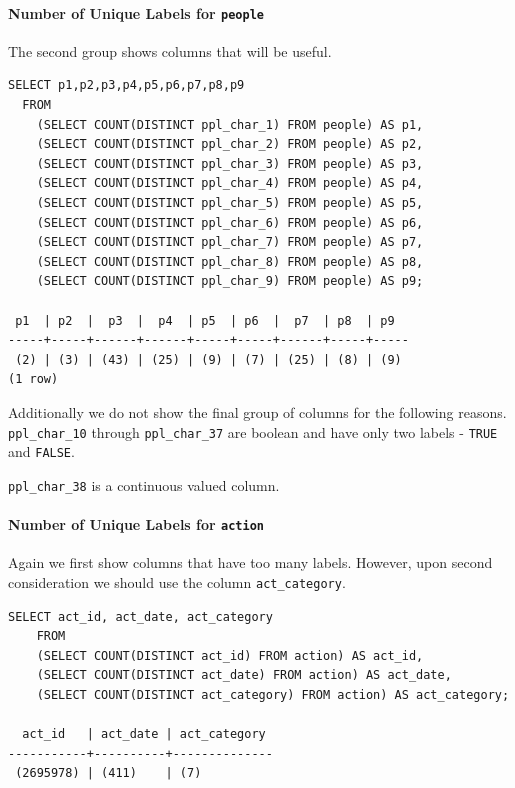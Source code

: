 \documentclass[]{report}
\begin{document}
\paragraph{Number of Unique Labels for
\texttt{people}}\label{number-of-unique-labels-for-people-1}

The second group shows columns that will be useful.

\begin{verbatim}
SELECT p1,p2,p3,p4,p5,p6,p7,p8,p9
  FROM
    (SELECT COUNT(DISTINCT ppl_char_1) FROM people) AS p1,
    (SELECT COUNT(DISTINCT ppl_char_2) FROM people) AS p2,
    (SELECT COUNT(DISTINCT ppl_char_3) FROM people) AS p3,
    (SELECT COUNT(DISTINCT ppl_char_4) FROM people) AS p4,
    (SELECT COUNT(DISTINCT ppl_char_5) FROM people) AS p5,
    (SELECT COUNT(DISTINCT ppl_char_6) FROM people) AS p6,
    (SELECT COUNT(DISTINCT ppl_char_7) FROM people) AS p7,
    (SELECT COUNT(DISTINCT ppl_char_8) FROM people) AS p8,
    (SELECT COUNT(DISTINCT ppl_char_9) FROM people) AS p9;

 p1  | p2  |  p3  |  p4  | p5  | p6  |  p7  | p8  | p9
-----+-----+------+------+-----+-----+------+-----+-----
 (2) | (3) | (43) | (25) | (9) | (7) | (25) | (8) | (9)
(1 row)
\end{verbatim}

Additionally we do not show the final group of columns for the following
reasons. \texttt{ppl\_char\_10} through \texttt{ppl\_char\_37} are
boolean and have only two labels - \texttt{TRUE} and \texttt{FALSE}.

\texttt{ppl\_char\_38} is a continuous valued column.

\pagebreak

\paragraph{Number of Unique Labels for
\texttt{action}}\label{number-of-unique-labels-for-action}

Again we first show columns that have too many labels. However, upon
second consideration we should use the column \texttt{act\_category}.

\begin{verbatim}
SELECT act_id, act_date, act_category
    FROM
    (SELECT COUNT(DISTINCT act_id) FROM action) AS act_id,
    (SELECT COUNT(DISTINCT act_date) FROM action) AS act_date,
    (SELECT COUNT(DISTINCT act_category) FROM action) AS act_category;

  act_id   | act_date | act_category
-----------+----------+--------------
 (2695978) | (411)    | (7)    
\end{verbatim}
\end{document}
